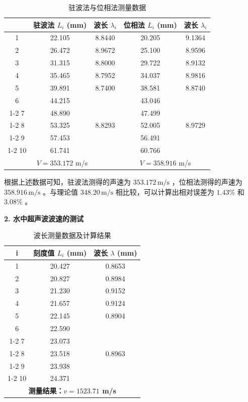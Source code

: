 \documentclass[zihao=5, UTF8]{article}
\theoremstyle{MyLineTheoremStyle} %
\theoremstyle{MyBlockTheoremStyle} %
\theoremstyle{MySubsubsectionStyle} %
\begin{document}
\begin{table}[H]
	\centering
	\begin{tabular}{|c|c|c|c|c|}
		\hline
		\textbf{} & \textbf{驻波法 $L_i$ (mm)} & \textbf{波长 $\lambda_i$} & \textbf{位相法 $L_i$ (mm)} & \textbf{波长 $\lambda_i$} \\ \hline
		1  & 22.105   & 8.8440  & 20.205  & 9.1364 \\ \hline
		2  & 26.472  & 8.9672 & 25.100  & 8.9596 \\ \hline
		3  & 31.315  & 8.8000  & 29.722  & 8.9132 \\ \hline
		4  & 35.465  & 8.7952 & 34.037  & 8.9816   \\ \hline
		5  & 39.891  & 8.7400  & 38.581  & 8.8740  \\ \hline
		6  & 44.215  & \multirow{5}{*}{8.8293} 
		        & 43.046  & \multirow{5}{*}{8.9729} \\ \cline{1-2} \cline{4-4}
		7  & 48.890  &        & 47.499  &         \\ \cline{1-2} \cline{4-4}
		8  & 53.325  &        & 52.005  &         \\ \cline{1-2} \cline{4-4}
		9  & 57.453  &        & 56.491  &         \\ \cline{1-2} \cline{4-4}
		10 & 61.741  &        & 60.766  &         \\ \hline
		\multicolumn{3}{|c|}{$V = 353.172$ m/s } & \multicolumn{2}{c|}{$V = 358.916$ m/s} \\ \hline
	\end{tabular}
	\caption{驻波法与位相法测量数据}
\end{table}

根据上述数据可知，驻波法测得的声速为 $353.172 \, \text{m/s}$ ，位相法测得的声速为 $358.916 \, \text{m/s}$ 。与理论值 $348.20 \, \text{m/s}$ 相比较，可以计算出相对误差为 $1.43\%$ 和 $3.08\%$ 。

\noindent \textbf{2. 水中超声波波速的测试}

\begin{table}[H]
	\centering
	\begin{tabular}{|c|c|c|}
		\hline
		\textbf{i} & \textbf{刻度值 $L_i$ (mm)} & \textbf{波长 $\lambda$ (mm)} \\ \hline
		1  & 20.427  & 0.8653  \\ \hline
		2  & 20.827  & 0.8984  \\ \hline
		3  & 21.230  & 0.9152  \\ \hline
		4  & 21.657  & 0.9124 \\ \hline
		5  & 22.145  & 0.8904 \\ \hline
		6  & 22.590  & \multirow{5}{*}{0.8963} \\ \cline{1-2}
		7  & 23.073  &        \\ \cline{1-2}
		8  & 23.518  &        \\ \cline{1-2}
		9  & 23.938  &        \\ \cline{1-2}
		10 & 24.371  &        \\ \hline
		\multicolumn{3}{|c|}{\textbf{测量结果：$v = 1523.71$ m/s}} \\ \hline
	\end{tabular}
	\caption{波长测量数据及计算结果}
\end{table}
\end{document}
